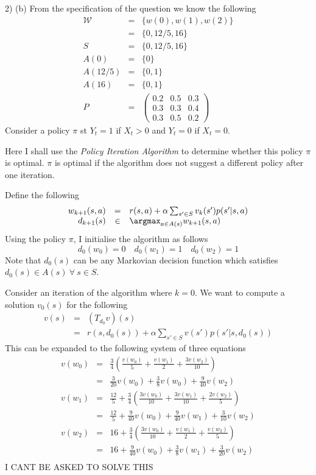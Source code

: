 \documentclass[11pt,a4paper]{article}
\begin{document}
\begin{answer}{2) (b)}
  From the specification of the question we know the following
  \[\begin{array}{rcl}
    \mathcal{W}&=&\{w(0),w(1),w(2)\}\\
    &=&\{0,12/5,16\}\\
    S&=&\{0,12/5,16\}\\
    A(0)&=&\{0\}\\
    A(12/5)&=&\{0,1\}\\
    A(16)&=&\{0,1\}\\
    P&=&\begin{pmatrix}
          0.2&0.5&0.3\\
          0.3&0.3&0.4\\
          0.3&0.5&0.2
        \end{pmatrix}
  \end{array}\]
  Consider a policy $\pi$ st $Y_t=1$ if $X_t>0$ and $Y_t=0$ if $X_t=0$.
  \par Here I shall use the \textit{Policy Iteration Algorithm} to determine whether this policy $\pi$ is optimal. $\pi$ is optimal if the algorithm does not suggest a different policy after one iteration.
  \par Define the following
  \[\begin{array}{rcl}
    w_{k+1}(s,a)&=&r(s,a)+\alpha\sum_{s'\in S}v_k(s')p(s'|s,a)\\
    d_{k+1}(s)&\in&\argmax_{a\in A(s)}w_{k+1}(s,a)
  \end{array}\]
  Using the policy $\pi$, I initialise the algorithm as follows
  \[ d_0(w_0)=0\quad d_0(w_1)=1 \quad d_0(w_2)=1 \]
  Note that $d_0(s)$ can be any Markovian decision function which satisfies $d_0(s)\in A(s)\ \forall\ s\in S$.
  \par Consider an iteration of the algorithm where $k=0$. We want to compute a solution $v_0(s)$ for the following
  \[\begin{array}{rcl}
    v(s)&=&(T_{d_0}v)(s)\\
    &=&r(s,d_0(s))+\alpha\sum_{s'\in S}v(s')p(s'|s,d_0(s))
  \end{array}\]
  This can be expanded to the following system of three equations
  \[\begin{array}{rcl}
    v(w_0)&=&\frac34\left(\frac{v(w_0)}5+\frac{v(w_1)}2+\frac{3v(w_2)}{10}\right)\\
    &=&\frac3{20}v(w_0)+\frac{3}{8}v(w_0)+\frac{9}{40}v(w_2)\\
    v(w_1)&=&\frac{12}5+\frac34\left(\frac{3v(w_0)}{10}+\frac{3v(w_1)}{10}+\frac{2v(w_2)}5\right)\\
    &=&\frac{12}5+\frac{9}{40}v(w_0)+\frac{9}{40}v(w_1)+\frac{3}{10}v(w_2)\\
    v(w_2)&=&16+\frac34\left(\frac{3v(w_0)}{10}+\frac{v(w_1)}{2}+\frac{v(w_2)}5\right)\\
    &=&16+\frac{9}{40}v(w_0)+\frac{3}{8}v(w_1)+\frac{3}{20}v(w_2)\\
  \end{array}\]
  I CANT BE ASKED TO SOLVE THIS
\end{answer}
\end{document}

